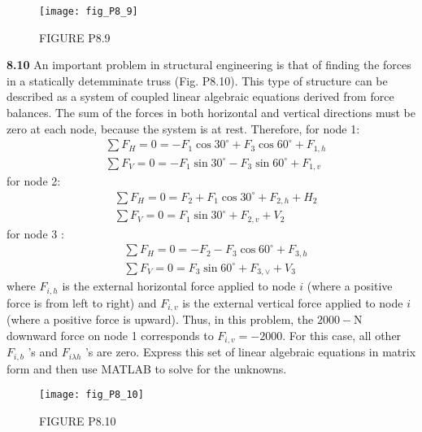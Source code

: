 \documentclass[../main.tex]{subfiles}
\begin{document}
\begin{multicols}{2}
    \begin{figure}[H]
        \centering
        \texttt{[image: fig\_P8\_9]}
        \caption{\textsf{FIGURE P8.9}}
        \label{fig:fig_P8_9}
    \end{figure}

    \noindent \textbf{8.10} An important problem in structural engineering is that of finding the forces in a statically detemminate truss (Fig. P8.10). This type of structure can be described as a system of coupled linear algebraic equations derived from force balances. The sum of the forces in both horizontal and
    vertical directions must be zero at each node, because the system is at rest. Therefore, for node 1:
    $$
    \begin{aligned}
    &\sum F_{H}=0=-F_{1} \cos 30^{\circ}+F_{3} \cos 60^{\circ}+F_{1, h} \\
    &\sum F_{V}=0=-F_{1} \sin 30^{\circ}-F_{3} \sin 60^{\circ}+F_{1, v}
    \end{aligned}
    $$
    for node 2:
    $$
    \begin{aligned}
    &\sum F_{H}=0=F_{2}+F_{1} \cos 30^{\circ}+F_{2, h}+H_{2} \\
    &\sum F_{V}=0=F_{1} \sin 30^{\circ}+F_{2, v}+V_{2}
    \end{aligned}
    $$
    for node 3 :
    $$
    \begin{aligned}
    &\sum F_{H}=0=-F_{2}-F_{3} \cos 60^{\circ}+F_{3, h} \\
    &\sum F_{V}=0=F_{3} \sin 60^{\circ}+F_{3, \vee}+V_{3}
    \end{aligned}
    $$
    where $F_{i, h}$ is the external horizontal force applied to node $i$ (where a positive force is from left to right) and $F_{i, v}$ is the external vertical force applied to node $i$ (where a positive force is upward). Thus, in this problem, the $2000-\mathrm{N}$ downward force on node 1 corresponds to $F_{i, v}=-2000$. For this case, all other $F_{i, b}$ 's and $F_{i \lambda h}$ 's are zero. Express this set of linear algebraic equations in matrix form and then use MATLAB to solve for the unknowns.

    \begin{figure}[H]
        \centering
        \texttt{[image: fig\_P8\_10]}
        \caption{\textsf{FIGURE P8.10}}
        \label{fig:fig_P8_10}
    \end{figure}


\end{multicols}
\end{document}
